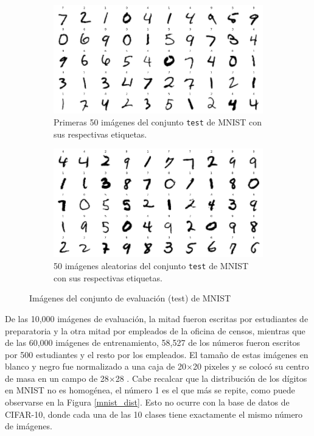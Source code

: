 \begin{figure}[h!]
    \centering
    \begin{subfigure}[b]{0.47\textwidth}
        \centering
        \includegraphics[width=\textwidth]{images/mnist/mnist_test_first50.png}
        \caption{Primeras 50 imágenes del conjunto \texttt{test} de MNIST con sus respectivas etiquetas.}
        \label{mnist3}
    \end{subfigure}
    \hspace{1em}
    \begin{subfigure}[b]{0.47\textwidth}
        \centering
        \includegraphics[width=\textwidth]{images/mnist/mnist_test_random.png}
        \caption{50 imágenes aleatorias del conjunto \texttt{test} de MNIST con sus respectivas etiquetas.}
        \label{mnist4}
    \end{subfigure}
    \caption{Imágenes del conjunto de evaluación (test) de MNIST}
    \label{mnist_test}
\end{figure}

De las 10,000 imágenes de evaluación, la mitad fueron escritas por estudiantes de preparatoria y la otra mitad por empleados de la oficina de censos, mientras que de las 60,000 imágenes de entrenamiento, 58,527 de los números fueron escritos por 500 estudiantes y el resto por los empleados. El tamaño de estas imágenes en blanco y negro fue normalizado a una caja de 20$\times$20 pixeles y se colocó su centro de masa en un campo de 28$\times$28 \cite{lecun2010mnist}. Cabe recalcar que la distribución de los dígitos en MNIST no es homogénea, el número 1 es el que más se repite, como puede observarse en la Figura \ref{mnist_dist}. Esto no ocurre con la base de datos de CIFAR-10, donde cada una de las 10 clases tiene exactamente el mismo número de imágenes.

